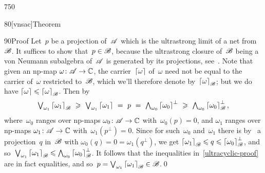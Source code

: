 \begin{parsec}{750}
\begin{point}{80}[vnsac]{Theorem}
\begin{point}{90}{Proof}
Let~$p$ be a projection of~$\mathscr{A}$ which is the ultrastrong limit
of a net from~$\mathscr{B}$. It suffices to show that~$p\in\mathscr{B}$,
because the ultrastrong closure of~$\mathscr{B}$
being a von Neumann subalgebra of~$\mathscr{A}$
is generated by its projections, see~.
Note that given an np-map $\omega\colon \mathscr{A}\to\mathbb{C}$,
the carrier~$\left\lceil\omega\right\rceil$ of~$\omega$
need not be equal to the carrier
of~$\omega$ restricted to~$\mathscr{B}$,
which we'll therefore denote by~$\left\lceil\omega\right\rceil_{\mathscr{B}}$;
but we do have $\left\lceil\omega\right\rceil\leqslant \left\lceil\omega\right\rceil_{\mathscr{B}}$.
Then by~
\begin{equation}
\label{ultracyclic-proof}
\textstyle
\bigvee_{\omega_1}
\ceil{\omega_1}_\scrB \ \geq\ 
\bigvee_{\omega_1}
\ceil{\omega_1}\ =\ p\ =\ 
\bigwedge_{\omega_0} \ceil{\omega_0}^\perp
\ \geq\ \bigwedge_{\omega_0} \ceil{\omega_0}_{\scrB}^\perp,
\end{equation}
where~$\omega_0$ ranges over np-maps $\omega_0\colon \mathscr{A}\to\mathbb{C}$
with~$\omega_0(p)=0$,
 and $\omega_1$ ranges over
np-maps $\omega_1\colon \mathscr{A}\to\mathbb{C}$ with~$\omega_1(p^\perp)=0$.
Since for such~$\omega_0$ and~$\omega_1$
there is 
by~
a projection~$q$ in~$\mathscr{B}$
with $\omega_0(q)=0=\omega_1(q^\perp)$,
we get 
$\left\lceil\omega_1\right\rceil_{\mathscr{B}} \leqslant q \leqslant 
\left\lceil\omega_0\right\rceil_{\mathscr{B}}^\perp$,
and so~$\bigvee_{\omega_1} \left\lceil\omega_1\right\rceil_{\mathscr{B}}
\leqslant 
\bigwedge_{\omega_0} \left\lceil\omega_0\right\rceil_{\mathscr{B}}^\perp$.
It follows that the inequalities in~\eqref{ultracyclic-proof}
are in fact equalities,
and so~$p=\bigvee_{\omega_1}\left\lceil\omega_1\right\rceil_{\mathscr{B}} \in \mathscr{B}$.\qed
\end{point}
\end{point}
\end{parsec}
